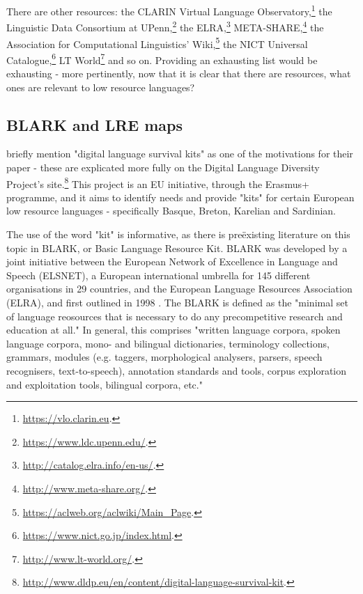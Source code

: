 There are other resources: the CLARIN Virtual Language Observatory,\footnote{\href{https://vlo.clarin.eu}{https://vlo.clarin.eu}. } the Linguistic Data Consortium at UPenn,\footnote{\href{https://www.ldc.upenn.edu/}{https://www.ldc.upenn.edu/}. } the ELRA,\footnote{\href{http://catalog.elra.info/en-us/}{http://catalog.elra.info/en-us/}. } META-SHARE,\footnote{\href{http://www.meta-share.org/}{http://www.meta-share.org/}. } the Association for Computational Linguistics' Wiki,\footnote{\href{https://aclweb.org/aclwiki/Main_Page}{https://aclweb.org/aclwiki/Main_Page}. } the NICT Universal Catalogue,\footnote{\href{https://www.nict.go.jp/index.html}{https://www.nict.go.jp/index.html}. } LT World\footnote{\href{http://www.lt-world.org/}{http://www.lt-world.org/}. } and so on. Providing an exhausting list would be exhausting - more pertinently, now that it is clear that there are resources, what ones are relevant to low resource languages?

\subsection{BLARK and LRE maps}
\label{subsec:blark-and-lre-maps}

\citet{soria2017digital} briefly mention "digital language survival kits" as one of the motivations for their paper - these are explicated more fully on the Digital Language Diversity Project's site.\footnote{\href{http://www.dldp.eu/en/content/digital-language-survival-kit}{http://www.dldp.eu/en/content/digital-language-survival-kit}. } This project is an EU initiative, through the Erasmus+ programme, and it aims to identify needs and provide "kits" for certain European low resource languages - specifically Basque, Breton, Karelian and Sardinian.

The use of the word "kit" is informative, as there is  pre\"{e}xisting literature on this topic in BLARK, or Basic Language Resource Kit. BLARK was developed by a joint initiative between the European Network of Excellence in Language and Speech (ELSNET), a European international umbrella for 145 different organisations in 29 countries, and the European Language Resources Association (ELRA), and first outlined in 1998 \citep{krauwer1998elsnet}. The BLARK is defined as the "minimal set of language reosources that is necessary to do any precompetitive research and education at all." \citep[4]{krauwer2003basic} In general, this comprises "written language corpora, spoken language corpora, mono- and bilingual dictionaries, terminology collections, grammars, modules (e.g. taggers, morphological analysers, parsers, speech recognisers, text-to-speech), annotation standards and tools, corpus exploration and exploitation tools, bilingual corpora, etc."

